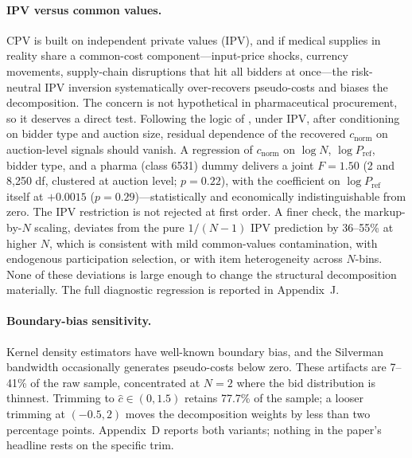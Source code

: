 \documentclass[12pt]{article}
\begin{document}
\paragraph{IPV versus common values.}
CPV is built on independent private values (IPV), and if medical
supplies in reality share a common-cost component---input-price
shocks, currency movements, supply-chain disruptions that hit
all bidders at once---the risk-neutral IPV inversion systematically
over-recovers pseudo-costs and biases the decomposition. The
concern is not hypothetical in pharmaceutical procurement, so it
deserves a direct test. Following the logic of
\citet{hendricks2003}, under IPV, after conditioning on bidder
type and auction size, residual dependence of the recovered
$c_{\text{norm}}$ on auction-level signals should vanish. A
regression of $c_{\text{norm}}$ on $\log N$, $\log P_{\text{ref}}$,
bidder type, and a pharma (class 6531) dummy delivers a joint
$F = 1.50$ (2 and 8{,}250 df, clustered at auction level;
$p = 0.22$), with the coefficient on $\log P_{\text{ref}}$ itself
at $+0.0015$ ($p = 0.29$)---statistically and economically
indistinguishable from zero. The IPV restriction is not rejected
at first order. A finer check, the markup-by-$N$ scaling,
deviates from the pure $1/(N-1)$ IPV prediction by 36--55\% at
higher $N$, which is consistent with mild common-values
contamination, with endogenous participation selection, or
with item heterogeneity across $N$-bins. None of these
deviations is large enough to change the structural
decomposition materially. The full diagnostic regression is
reported in Appendix~J.

\paragraph{Boundary-bias sensitivity.}
Kernel density estimators have well-known boundary bias, and
the Silverman bandwidth occasionally generates pseudo-costs
below zero. These artifacts are 7--41\% of the raw sample,
concentrated at $N = 2$ where the bid distribution is thinnest.
Trimming to $\hat c \in (0, 1.5)$ retains 77.7\% of the sample;
a looser trimming at $(-0.5, 2)$ moves the decomposition weights
by less than two percentage points. Appendix~D reports both
variants; nothing in the paper's headline rests on the specific
trim.
\end{document}
